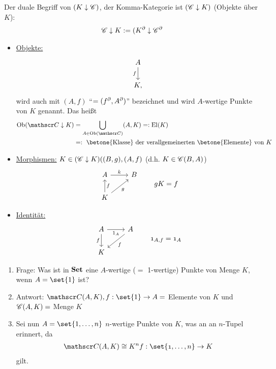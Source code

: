 \begin{folg}
	Der duale Begriff von $(K \downarrow \mathscr C)$, der Komma-Kategorie ist $(\mathscr C \downarrow K)$ (Objekte über $K$): 
	\begin{align*}
		\mathscr C \downarrow K := (K^{\partial} \downarrow \mathscr C^{\partial}
	\end{align*}
	\begin{itemize}
		\item \ul{Objekte:}
		\begin{align*}
			\begin{tikzcd}
				A \arrow[d, "f"'] \\ K,
			\end{tikzcd} 
		\end{align*}
		wird auch mit $(A,f)$ ``$= (f^{\partial}, A^{\partial})$'' bezeichnet und wird $A$-wertige Punkte von $K$ genannt. Das heißt
		\begin{align*}
			\Ob(\Cat \downarrow K) &= \bigcup_{A \in \Ob(\Cat)}(A,K) =: \El(K)\\
			&=: \text{ \betone{Klasse} der verallgemeinerten \betone{Elemente} von } K 
		\end{align*}
		\item \ul{Morphismen:} $K \in (\mathscr C \downarrow K)((B,g),(A,f)$ (d.h. $K \in \mathscr C(B,A)$)
		\begin{align*}
			\begin{tikzcd}[ampersand replacement=\&]
				A \arrow[r, "k"] \& B\\
				K \arrow[u, "f"'] \arrow[ur, "g"'] 
			\end{tikzcd} \qquad \mit gK = f
		\end{align*}
		\item \ul{Identität:}
		\begin{align*}
			\begin{tikzcd}[ampersand replacement=\&]
				A \arrow[d, "f"'] \arrow[r, "1_A"'] \& A \arrow[dl, "f"] \\
				K 
			\end{tikzcd}
			\qquad \mit 1_{A,f} = 1_A
		\end{align*}
	\end{itemize}
\end{folg}
\begin{bemerkung}\enter
	\begin{enumerate}[label=] %
		\item Frage:  Was ist in $\operatorname{\mathbf{Set}}$ eine $A$-wertige ($=$ 1-wertige) Punkte von Menge $K$, wenn $A = \set{1}$ ist?
		\item Antwort: $\Cat(A,K), f: \set{1} \to A=$ Elemente von $K$ und $\mathscr C(A,K) = $ Menge $K$ %
		\item Sei nun $A = \set{1,\dots, n}$ $n$-wertige Punkte von $K$, was an an $n$-Tupel erinnert, da
		\begin{align*}
			\Cat(A,K) \cong K^n \mit f: \set{1, \dots, n} \to K
		\end{align*}
		gilt.
	\end{enumerate}
\end{bemerkung}